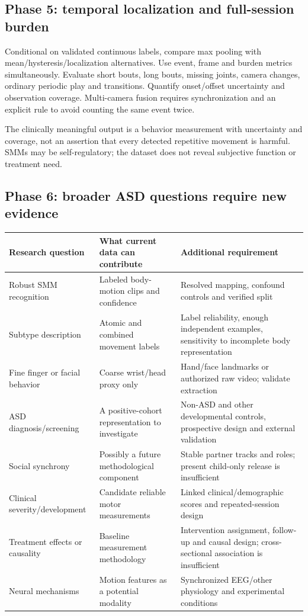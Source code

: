 \subsection{Phase 5: temporal localization and full-session burden}
Conditional on validated continuous labels, compare max pooling with mean/hysteresis/localization alternatives. Use event, frame and burden metrics simultaneously. Evaluate short bouts, long bouts, missing joints, camera changes, ordinary periodic play and transitions. Quantify onset/offset uncertainty and observation coverage. Multi-camera fusion requires synchronization and an explicit rule to avoid counting the same event twice.

The clinically meaningful output is a behavior measurement with uncertainty and coverage, not an assertion that every detected repetitive movement is harmful. SMMs may be self-regulatory; the dataset does not reveal subjective function or treatment need. \cite[pp.~2--3]{barami2024}

\subsection{Phase 6: broader ASD questions require new evidence}
\begin{longtable}{@{}P{.27\linewidth}P{.32\linewidth}P{.33\linewidth}@{}}\toprule
Research question & What current data can contribute & Additional requirement\\\midrule\endhead
Robust SMM recognition & Labeled body-motion clips and confidence & Resolved mapping, confound controls and verified split\\
Subtype description & Atomic and combined movement labels & Label reliability, enough independent examples, sensitivity to incomplete body representation\\
Fine finger or facial behavior & Coarse wrist/head proxy only & Hand/face landmarks or authorized raw video; validate extraction\\
ASD diagnosis/screening & A positive-cohort representation to investigate & Non-ASD and other developmental controls, prospective design and external validation\\
Social synchrony & Possibly a future methodological component & Stable partner tracks and roles; present child-only release is insufficient\\
Clinical severity/development & Candidate reliable motor measurements & Linked clinical/demographic scores and repeated-session design\\
Treatment effects or causality & Baseline measurement methodology & Intervention assignment, follow-up and causal design; cross-sectional association is insufficient\\
Neural mechanisms & Motion features as a potential modality & Synchronized EEG/other physiology and experimental conditions\\\bottomrule
\end{longtable}

